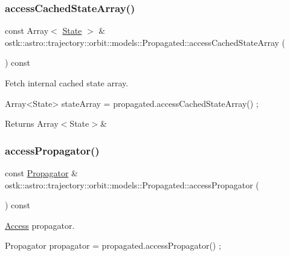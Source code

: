 \subsubsection{\texorpdfstring{access\+Cached\+State\+Array()}{accessCachedStateArray()}}
{\footnotesize\ttfamily const Array$<$ \hyperlink{classostk_1_1astro_1_1trajectory_1_1_state}{State} $>$ \& ostk\+::astro\+::trajectory\+::orbit\+::models\+::\+Propagated\+::access\+Cached\+State\+Array (\begin{DoxyParamCaption}{ }\end{DoxyParamCaption}) const}



Fetch internal cached state array. 


\begin{DoxyCode}
Array<State> stateArray = propagated.accessCachedStateArray() ;
\end{DoxyCode}
 \begin{DoxyReturn}{Returns}
Array$<$\+State$>$\& 
\end{DoxyReturn}
\mbox{\label{classostk_1_1astro_1_1trajectory_1_1orbit_1_1models_1_1_propagated_aabd25012cfd543722032f5bab8c0a3a3}} 
\subsubsection{\texorpdfstring{access\+Propagator()}{accessPropagator()}}
{\footnotesize\ttfamily const \hyperlink{classostk_1_1astro_1_1trajectory_1_1_propagator}{Propagator} \& ostk\+::astro\+::trajectory\+::orbit\+::models\+::\+Propagated\+::access\+Propagator (\begin{DoxyParamCaption}{ }\end{DoxyParamCaption}) const}



\hyperlink{classostk_1_1astro_1_1_access}{Access} propagator. 


\begin{DoxyCode}
Propagator propagator = propagated.accessPropagator() ;
\end{DoxyCode}


